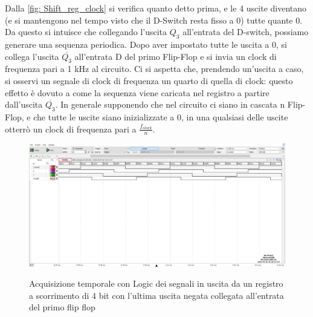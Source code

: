 \documentclass[10pt, a4paper, italian]{article}
\begin{document}
Dalla \cref{fig: Shift_reg_clock} si verifica quanto detto prima, e le 4 uscite diventano (e si mantengono nel tempo visto che il D-Switch resta fisso a 0) tutte quante 0.
Da questo si intuisce che collegando l'uscita $Q_3$ all'entrata del D-switch, possiamo generare una sequenza periodica.
Dopo aver impostato tutte le uscita a 0, si collega l'uscita $\overline{Q_3}$ all'entrata D del primo Flip-Flop e si  invia un clock di frequenza pari a 1 kHz al circuito.
Ci si aspetta che, prendendo un'uscita a caso, si osservi un segnale di clock di frequenza un quarto di quella di clock: questo effetto è dovuto a come la sequenza viene caricata nel registro a partire dall'uscita $\overline{Q_3}$.
In generale supponendo che nel circuito ci siano in cascata n Flip-Flop, e che tutte le uscite siano inizializzate a 0, in una qualsiasi delle uscite otterrò un clock di frequenza pari a $\frac{f_{clock}}{n}$.
\begin{figure}
	\includegraphics[width=\textwidth]{3.e}
	\label{fig: Shift_reg_seq}
	\caption{Acquisizione temporale con Logic dei segnali in uscita da un registro a scorrimento di 4 bit con l'ultima uscita negata collegata all'entrata del primo flip flop}
\end{figure}
\end{document}

